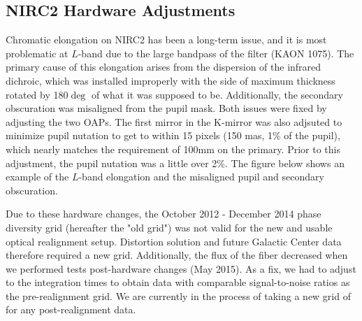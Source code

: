 \subsection{NIRC2 Hardware Adjustments}
Chromatic elongation on NIRC2 has been a long-term issue, and it is most problematic at $L$-band due to the large bandpass of the filter (KAON 1075). The primary cause of this elongation arises from the dispersion of the infrared dichroic, which was installed improperly with the side of maximum thickness rotated by 180$\deg$ of what it was supposed to be. Additionally, the secondary obscuration was misaligned from the pupil mask. Both issues were fixed by adjusting the two OAPs. The first mirror in the K-mirror was also adjsuted to minimize pupil nutation to get to within 15 pixels (150 mas, 1\% of the pupil), which nearly matches the requirement of 100mm on the primary. Prior to this adjustment, the pupil nutation was a little over 2\%. The figure below shows an example of the $L$-band elongation and the misaligned pupil and secondary obscuration.

Due to these hardware changes, the October 2012 - December 2014 phase diversity grid (hereafter the "old grid") was not valid for the new and usable optical realignment setup. Distortion solution and future Galactic Center data therefore required a new grid. Additionally, the flux of the fiber decreased when we performed tests post-hardware changes (May 2015). As a fix, we had to adjust to the integration times to obtain data with comparable signal-to-noise ratios as the pre-realignment grid. We are currently in the process of taking a new grid of for any post-realignment data.

    
    
    
  
  
  
  